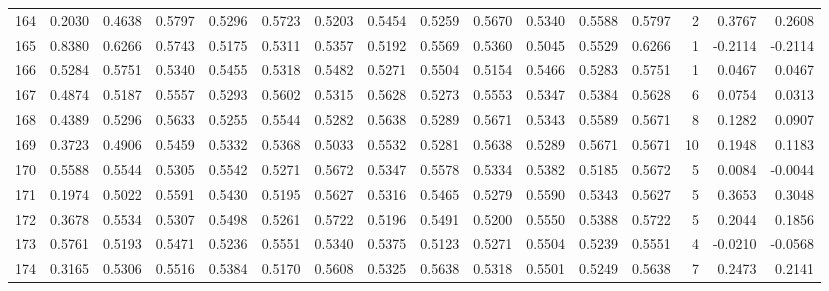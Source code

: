 \begin{tabular}{lrrrrrrrrrrrrrrr}
164 &      0.2030 &  0.4638 &  0.5797 &  0.5296 &  0.5723 &  0.5203 &  0.5454 &  0.5259 &  0.5670 &  0.5340 &   0.5588 &     0.5797 &      2 &                    0.3767 &                     0.2608 \\
165 &      0.8380 &  0.6266 &  0.5743 &  0.5175 &  0.5311 &  0.5357 &  0.5192 &  0.5569 &  0.5360 &  0.5045 &   0.5529 &     0.6266 &      1 &                   -0.2114 &                    -0.2114 \\
166 &      0.5284 &  0.5751 &  0.5340 &  0.5455 &  0.5318 &  0.5482 &  0.5271 &  0.5504 &  0.5154 &  0.5466 &   0.5283 &     0.5751 &      1 &                    0.0467 &                     0.0467 \\
167 &      0.4874 &  0.5187 &  0.5557 &  0.5293 &  0.5602 &  0.5315 &  0.5628 &  0.5273 &  0.5553 &  0.5347 &   0.5384 &     0.5628 &      6 &                    0.0754 &                     0.0313 \\
168 &      0.4389 &  0.5296 &  0.5633 &  0.5255 &  0.5544 &  0.5282 &  0.5638 &  0.5289 &  0.5671 &  0.5343 &   0.5589 &     0.5671 &      8 &                    0.1282 &                     0.0907 \\
169 &      0.3723 &  0.4906 &  0.5459 &  0.5332 &  0.5368 &  0.5033 &  0.5532 &  0.5281 &  0.5638 &  0.5289 &   0.5671 &     0.5671 &     10 &                    0.1948 &                     0.1183 \\
170 &      0.5588 &  0.5544 &  0.5305 &  0.5542 &  0.5271 &  0.5672 &  0.5347 &  0.5578 &  0.5334 &  0.5382 &   0.5185 &     0.5672 &      5 &                    0.0084 &                    -0.0044 \\
171 &      0.1974 &  0.5022 &  0.5591 &  0.5430 &  0.5195 &  0.5627 &  0.5316 &  0.5465 &  0.5279 &  0.5590 &   0.5343 &     0.5627 &      5 &                    0.3653 &                     0.3048 \\
172 &      0.3678 &  0.5534 &  0.5307 &  0.5498 &  0.5261 &  0.5722 &  0.5196 &  0.5491 &  0.5200 &  0.5550 &   0.5388 &     0.5722 &      5 &                    0.2044 &                     0.1856 \\
173 &      0.5761 &  0.5193 &  0.5471 &  0.5236 &  0.5551 &  0.5340 &  0.5375 &  0.5123 &  0.5271 &  0.5504 &   0.5239 &     0.5551 &      4 &                   -0.0210 &                    -0.0568 \\
174 &      0.3165 &  0.5306 &  0.5516 &  0.5384 &  0.5170 &  0.5608 &  0.5325 &  0.5638 &  0.5318 &  0.5501 &   0.5249 &     0.5638 &      7 &                    0.2473 &                     0.2141 \\

\end{tabular}
